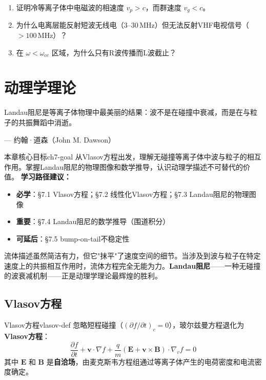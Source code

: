 \documentclass[12pt,a4paper,openany,oneside]{book}
\newcommand{\vect}[1]{\bm{#1}}
\newcommand{\grad}{\nabla}
\newcommand{\difficulty}[1]{\marginnote{\textcolor{red}{\textbf{[#1]}}}}
\begin{document}
\begin{miniquiz}
\begin{enumerate}
\item 证明冷等离子体中电磁波的相速度 $v_p > c$，而群速度 $v_g < c$。
\item 为什么电离层能反射短波无线电（$3$--$30\,\mathrm{MHz}$）但无法反射VHF电视信号（$>100\,\mathrm{MHz}$）？
\item 在 $\omega < \omega_{ce}$ 区域，为什么只有R波传播而L波截止？
\end{enumerate}
\end{miniquiz}


\chapter{动理学理论}
\epigraph{Landau阻尼是等离子体物理中最美丽的结果：波不是在碰撞中衰减，而是在与粒子的共振舞蹈中消逝。}{--- 约翰·道森（John M. Dawson）}

\begin{insight}{本章核心目标}{ch7-goal}
从Vlasov方程出发，理解无碰撞等离子体中波与粒子的相互作用。掌握Landau阻尼的物理图像和数学推导，认识动理学描述不可替代的价值。
\tcblower
\textbf{学习路径建议：}

\begin{itemize}[leftmargin=*]
\item[\textcolor{red}{$\blacksquare$}] \textbf{必学}：\S7.1 Vlasov方程；\S7.2 线性化Vlasov方程；\S7.3 Landau阻尼的物理图像
\item[\textcolor{orange}{$\blacksquare$}] \textbf{重要}：\S7.4 Landau阻尼的数学推导（围道积分）
\item[\textcolor{green}{$\blacksquare$}] \textbf{可延后}：\S7.5  bump-on-tail不稳定性
\end{itemize}
\end{insight}

流体描述虽然简洁有力，但它"抹平"了速度空间的细节。当涉及到波与粒子在特定速度上的共振相互作用时，流体方程完全无能为力。\textbf{Landau阻尼}——一种无碰撞的波衰减机制——正是动理学理论最辉煌的胜利。

\section{Vlasov方程}\difficulty{基础}

\begin{definition}{Vlasov方程}{vlasov-def}
忽略短程碰撞（$(\partial f/\partial t)_c = 0$），玻尔兹曼方程退化为\textbf{Vlasov方程}：
\[
\frac{\partial f}{\partial t} + \vect{v}\cdot\grad f + \frac{q}{m}(\vect{E} + \vect{v}\times\vect{B})\cdot\grad_v f = 0
\]
其中 $\vect{E}$ 和 $\vect{B}$ 是\textbf{自洽场}，由麦克斯韦方程组通过等离子体产生的电荷密度和电流密度确定。
\end{definition}
\end{document}

